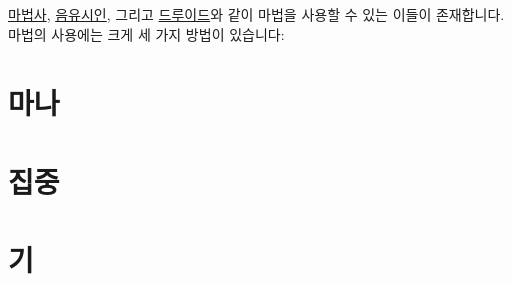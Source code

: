\documentclass{report}
\begin{document}
	\hyperlink{class:wizard}{마법사}, \hyperlink{class:bard}{음유시인}, 그리고 \hyperlink{class:druid}{드루이드}와 같이 마법을 사용할 수 있는 이들이 존재합니다. 마법의 사용에는 크게 세 가지 방법이 있습니다:
		
	
	\section{마나}
		
		
	\section{집중}
		
		
	\section{기}
		
\end{document}
